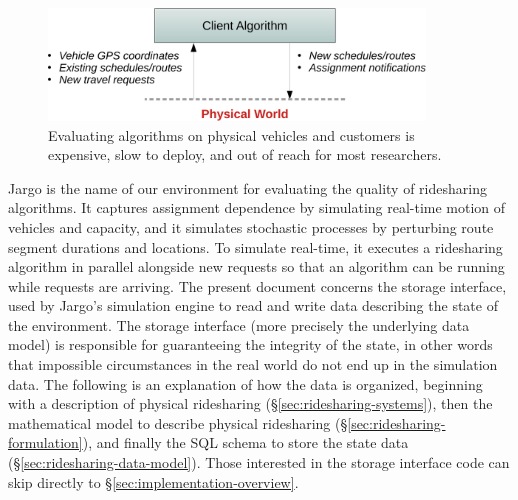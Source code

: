 \documentclass{article}
\theoremstyle{definition}
\begin{document}
\begin{figure}[h]
\centering
\includegraphics[width=100mm]{src/fig/physical}
\caption{Evaluating algorithms on physical vehicles and customers is expensive,
    slow to deploy, and out of reach for most researchers.}
\label{fig:physical}
\end{figure}

Jargo is the name of our environment for evaluating the quality of ridesharing
algorithms. It captures assignment dependence by simulating real-time motion of
vehicles and capacity, and it simulates stochastic processes by perturbing
route segment durations and locations. To simulate real-time, it executes a
ridesharing algorithm in parallel alongside new requests so that an algorithm
can be running while requests are arriving. The present document concerns the
storage interface, used by Jargo's simulation engine to read and write data
describing the state of the environment. The storage interface (more precisely
the underlying data model) is responsible for guaranteeing the integrity of the
state, in other words that impossible circumstances in the real world do not
end up in the simulation data. The following is an explanation of how the data
is organized, beginning with a description of physical ridesharing
(\S\ref{sec:ridesharing-systems}), then the mathematical model to describe
physical ridesharing (\S\ref{sec:ridesharing-formulation}), and finally the
SQL schema to store the state data (\S\ref{sec:ridesharing-data-model}).  Those interested
in the storage interface code can skip directly to
\S\ref{sec:implementation-overview}.
\end{document}
